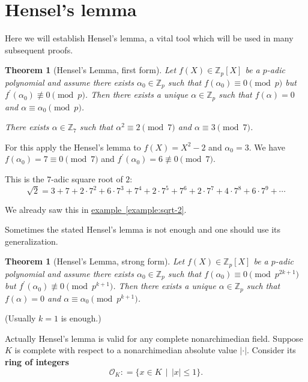 \documentclass{article}
\newcommand{\term}{\textbf}
\newcommand{\dfn}{\mathrel{\mathop:}=}
\newcommand{\ZZ}{\mathbb{Z}}
\newcommand{\refref}[2]{\hyperref[#2]{#1~\ref*{#2}}}
\newcommand{\examplesymbol}{$\blacktriangle$}
\renewcommand{\qedsymbol}{$\blacksquare$}
\theoremstyle{myplain}
\newtheorem{theorem}[proposition]{Theorem}
\theoremstyle{mydefinition}
\newenvironment{example}
  {\pushQED{\qed}\renewcommand{\qedsymbol}{\examplesymbol}\examplex}
  {\popQED\endexamplex}
\begin{document}
\section{Hensel's lemma}

Here we will establish Hensel's lemma, a vital tool which will be used in many
subsequent proofs.

\begin{theorem}[Hensel's Lemma, first form]\label{theorem:Hensel-first}
  Let $f (X) \in \ZZ_p [X]$ be a $p$-adic polynomial and assume there exists
  $\alpha_0 \in \ZZ_p$ such that $f (\alpha_0) \equiv 0 \pmod{p}$ but
  $f^\prime (\alpha_0) \not\equiv 0 \pmod{p}$. Then there exists a unique
  $\alpha \in \ZZ_p$ such that $f (\alpha) = 0$ and
  $\alpha \equiv \alpha_0 \pmod{p}$.
\end{theorem}

\begin{example}
  \emph{There exists $\alpha \in \ZZ_7$ such that $\alpha^2 \equiv 2 \pmod{7}$
    and $\alpha \equiv 3 \pmod{7}$.}

  For this apply the Hensel's lemma to $f (X) = X^2 - 2$ and $\alpha_0 = 3$.
  We have $f (\alpha_0) = 7 \equiv 0 \pmod{7}$ and
  $f^\prime (\alpha_0) = 6 \not\equiv 0 \pmod{7}$.

  This is the $7$-adic square root of $2$:
  $$\sqrt{2} = 3 + 7 + 2\cdot 7^2 + 6\cdot 7^3 + 7^4 + 2\cdot 7^5 + 7^6 + 2\cdot 7^7 + 4\cdot 7^8 + 6\cdot 7^9 + \cdots$$

  We already saw this in \refref{example}{example:sqrt-2}.
\end{example}

Sometimes the stated Hensel's lemma is not enough and one should use its
generalization.

\begin{theorem}[Hensel's Lemma, strong form]\label{theorem:Hensel-strong}
  Let $f (X) \in \ZZ_p [X]$ be a $p$-adic polynomial and assume there exists
  $\alpha_0 \in \ZZ_p$ such that $f (\alpha_0) \equiv 0 \pmod{p^{2k+1}}$ but
  $f^\prime (\alpha_0) \not\equiv 0 \pmod{p^{k+1}}$. Then there exists a unique
  $\alpha \in \ZZ_p$ such that $f (\alpha) = 0$ and
  $\alpha \equiv \alpha_0 \pmod{p^{k+1}}$.
\end{theorem}

\noindent (Usually $k = 1$ is enough.)

\vspace{1em}

Actually Hensel's lemma is valid for any complete nonarchimedian field. Suppose
$K$ is complete with respect to a nonarchimedian absolute value
$|\cdot|$. Consider its \term{ring of integers}
$$\mathcal{O}_K \dfn \{ x \in K \,\mid\, |x| \le 1 \}.$$
\end{document}
